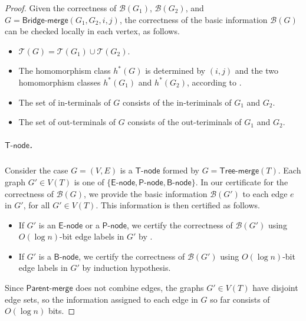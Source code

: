 \documentclass[11pt]{article}
\theoremstyle{definition}
\theoremstyle{remark}
\newcommand{\tmerge}{\mathsf{Tree}\text{-}\mathsf{merge}}
\newcommand{\pmerge}{\mathsf{Parent}\text{-}\mathsf{merge}}
\newcommand{\bmerge}{\mathsf{Bridge}\text{-}\mathsf{merge}}
\newcommand{\vnode}{\mathsf{V}\text{-}\mathsf{node}}
\newcommand{\enode}{\mathsf{E}\text{-}\mathsf{node}}
\newcommand{\bnode}{\mathsf{B}\text{-}\mathsf{node}}
\newcommand{\pnode}{\mathsf{P}\text{-}\mathsf{node}}
\newcommand{\tnode}{\mathsf{T}\text{-}\mathsf{node}}
\begin{document}
\begin{proof}
Given the correctness of $\mathcal{B}(G_1)$, $\mathcal{B}(G_2)$, and $G=\bmerge(G_1, G_2, i, j)$, the correctness of the basic information  $\mathcal{B}(G)$ can be checked locally in each vertex, as follows.
\begin{itemize}
    \item $\mathcal{T}(G) = \mathcal{T}(G_1) \cup \mathcal{T}(G_2)$.
    \item The homomorphism class $h^\ast(G)$ is determined by $(i,j)$ and the two homomorphism classes $h^\ast(G_1)$ and $h^\ast(G_2)$, according to .
    \item The set of in-terminals of $G$ consists of the in-teriminals of $G_1$ and $G_2$.
    \item The set of out-terminals of $G$ consists of the out-teriminals of $G_1$ and $G_2$.
\end{itemize}


  
 


 \subparagraph{$\tnode$.} Consider the case $G=(V,E)$ is a $\tnode$ formed by $G=\tmerge(T)$. Each graph $G' \in V(T)$ is one of $\{\enode,\pnode,\bnode\}$. In our certificate for the correctness of $\mathcal{B}(G)$, we provide the basic information $\mathcal{B}(G')$ to each edge $e$ in $G'$, for all $G' \in V(T)$. This information is then certified as follows.
\begin{itemize}
    \item If $G'$ is an $\enode$ or a $\pnode$, we certify the correctness of $\mathcal{B}(G')$ using $O(\log n)$-bit edge labels in $G'$ by .
    \item If $G'$ is a $\bnode$, we certify the correctness of $\mathcal{B}(G')$ using $O(\log n)$-bit edge labels in $G'$ by induction hypothesis. 
\end{itemize}
Since $\pmerge$ does not combine edges, the graphs $G' \in V(T)$ have disjoint edge sets, so the information assigned to each edge in $G$ so far consists of $O(\log n)$ bits.


\end{proof}
\end{document}
